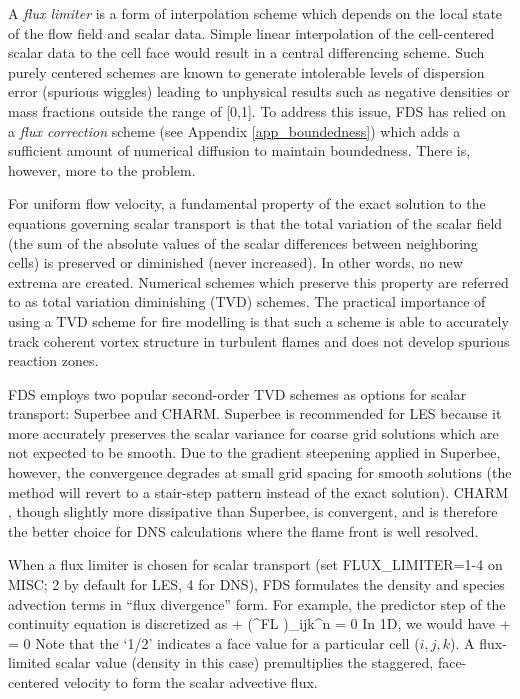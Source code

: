 A \emph{flux limiter} is a form of interpolation scheme which depends on the local state of the flow field and scalar data. Simple linear interpolation of the cell-centered scalar data to the cell face would result in a central differencing scheme.  Such purely centered schemes are known to generate intolerable levels of dispersion error (spurious wiggles) leading to unphysical results such as negative densities or mass fractions outside the range of [0,1].  To address this issue, FDS has relied on a \emph{flux correction} scheme (see Appendix \ref{app_boundedness}) which adds a sufficient amount of numerical diffusion to maintain boundedness.  There is, however, more to the problem.

For uniform flow velocity, a fundamental property of the exact solution to the equations governing scalar transport is that the total variation of the scalar field (the sum of the absolute values of the scalar differences between neighboring cells) is preserved or diminished (never increased).  In other words, no new extrema are created.  Numerical schemes which preserve this property are referred to as total variation diminishing (TVD) schemes.  The practical importance of using a TVD scheme for fire modelling is that such a scheme is able to accurately track coherent vortex structure in turbulent flames and does not develop spurious reaction zones.

FDS employs two popular second-order TVD schemes as options for scalar transport: Superbee and CHARM.  Superbee \cite{Roe:1986} is recommended for LES because it more accurately preserves the scalar variance for coarse grid solutions which are not expected to be smooth.  Due to the gradient steepening applied in Superbee, however, the convergence degrades at small grid spacing for smooth solutions (the method will revert to a stair-step pattern instead of the exact solution).  CHARM \cite{Zhou:1995}, though slightly more dissipative than Superbee, is convergent, and is therefore the better choice for DNS calculations where the flame front is well resolved.

When a flux limiter is chosen for scalar transport (set {\ct FLUX\_LIMITER=1-4} on {\ct MISC}; 2 by default for LES, 4 for DNS), FDS formulates the density and species advection terms in ``flux divergence'' form.  For example, the predictor step of the continuity equation is discretized as
\be  {}
    + \nabla\!\cdot(\overline{\rho}^{FL} )_{ijk}^n = 0
\ee
In 1D, we would have
\be  {}
    +  = 0
\ee
Note that the `1/2' indicates a face value for a particular cell ($i,j,k$). A flux-limited scalar value (density in this case) premultiplies the staggered, face-centered velocity to form the scalar advective flux.

